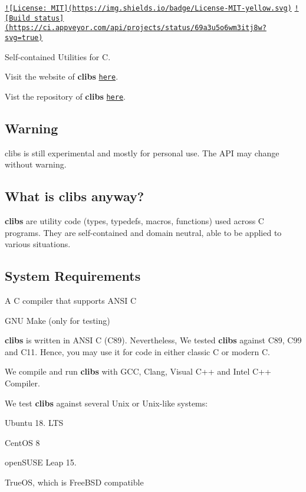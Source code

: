 \href{https://opensource.org/licenses/MIT}{\tt !\mbox{[}License\-: M\-I\-T\mbox{]}(https\-://img.\-shields.\-io/badge/\-License-\/\-M\-I\-T-\/yellow.\-svg)} \href{https://ci.appveyor.com/project/cwchentw/clibs}{\tt !\mbox{[}Build status\mbox{]}(https\-://ci.\-appveyor.\-com/api/projects/status/69a3u5o6wm3itj8w?svg=true)}

Self-\/contained Utilities for C.

Visit the website of {\bfseries clibs} \href{https://cwchentw.github.io/clibs/html/index.html}{\tt here}.

Vist the repository of {\bfseries clibs} \href{https://github.com/cwchentw/clibs/}{\tt here}.

\subsection*{Warning}

clibs is still experimental and mostly for personal use. The A\-P\-I may change without warning.

\subsection*{What is clibs anyway?}

{\bfseries clibs} are utility code (types, typedefs, macros, functions) used across C programs. They are self-\/contained and domain neutral, able to be applied to various situations.

\subsection*{System Requirements}


\begin{DoxyItemize}
\item A C compiler that supports A\-N\-S\-I C
\item G\-N\-U Make (only for testing)
\end{DoxyItemize}

{\bfseries clibs} is written in A\-N\-S\-I C (C89). Nevertheless, We tested {\bfseries clibs} against C89, C99 and C11. Hence, you may use it for code in either classic C or modern C.

We compile and run {\bfseries clibs} with G\-C\-C, Clang, Visual C++ and Intel C++ Compiler.

We test {\bfseries clibs} against several Unix or Unix-\/like systems\-:


\begin{DoxyItemize}
\item Ubuntu 18. L\-T\-S
\item Cent\-O\-S 8
\item open\-S\-U\-S\-E Leap 15.
\item True\-O\-S, which is Free\-B\-S\-D compatible
\end{DoxyItemize}

